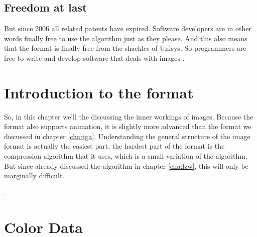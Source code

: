 \begin{refsection}
  \subsection{Freedom at last}

  But since 2006 all \lzw related patents have expired. Software
  developers are in other words finally free to use the \lzw algorithm
  just as they please. And this also means that the \gif format is
  finally free from the shackles of Unisys. So programmers are free to
  write and develop software that deals with \gif images \cite{caie:_sad}.

  \section{Introduction to the \gif format}

  So, in this chapter we'll the discussing the inner workings of \gif
  images. Because the \gif format also supports animation, it is
  slightly more advanced than the \tga format we discussed in chapter
  \ref{cha:tga}. Understanding the general structure of the image
  format is actually the easiest part, the hardest part of the format
  is the compression algorithm that it uses, which is a small
  variation of the \lzw algorithm. But since already discussed the \lzw
  algorithm in chapter \ref{cha:lzw}, this will only be marginally
  difficult.

  \cite{incorporated:_graph_inter_format}.

  \section{Color Data}

  \printbibliography[heading=  subbibliography]

\end{refsection}